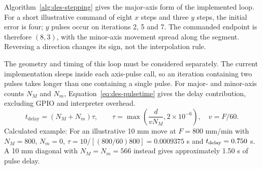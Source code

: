 Algorithm~\ref{alg:des-stepping} gives the major-axis form of the implemented loop. For a short illustrative command of eight $x$ steps and three $y$ steps, the initial error is four; $y$ pulses occur on iterations 2, 5 and 7. The commanded endpoint is therefore $(8,3)$, with the minor-axis movement spread along the segment. Reversing a direction changes its sign, not the interpolation rule.~\cite[hardware clarifications]{brauneevidence2026}


\begin{designalgorithm}
\caption{Coordinated axis stepping with interruption checks~\cite{brauneevidence2026,braunepipeline2026}}
\label{alg:des-stepping}
\begin{designpseudo}
\end{designpseudo}
\end{designalgorithm}

The geometry and timing of this loop must be considered separately. The current implementation sleeps inside each axis-pulse call, so an iteration containing two pulses takes longer than one containing a single pulse. For major- and minor-axis counts $N_M$ and $N_m$, Equation~\ref{eq:des-pulsetime} gives the delay contribution, excluding GPIO and interpreter overhead.
\begin{equation}
t_{\mathrm{delay}}=(N_M+N_m)\tau,\qquad
\tau=\max\left(\frac{d}{vN_M},2\times10^{-6}\right),\quad v=F/60.
\label{eq:des-pulsetime}
\end{equation}
Calculated example: For an illustrative 10 mm move at $F=800$ mm/min with $N_M=800$, $N_m=0$, $\tau=10/[(800/60)800]=0.0009375$ s and $t_{\rm delay}=0.750$ s. A 10 mm diagonal with $N_M=N_m=566$ instead gives approximately 1.50 s of pulse delay. \cite[reproduce.py, BresenhamMove]{braunepipeline2026}

